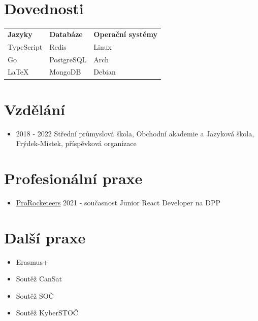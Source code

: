 \documentclass[12pt,a4paper]{article}
\begin{document}
\section*{Dovednosti}

\begin{center}
  \begin{tabular}{ l l l }
    \textbf{\large Jazyky} & \textbf{\large Databáze} & \textbf{\large Operační
      systémy}
    \\
    TypeScript            & Redis                    & Linux
    \\
    Go                    & PostgreSQL               & Arch
    \\
    LaTeX                 & MongoDB                  & Debian
    \\
  \end{tabular}
\end{center}

\section*{Vzdělání}

\begin{itemize}
  \item 2018 - 2022 Střední průmyslová škola, Obchodní akademie a
        Jazyková škola,
        Frýdek-Místek, příspěvková organizace
\end{itemize}

\section*{Profesionální praxe}
\begin{itemize}
  \item \underline{\href{https://www.prorocketeers.com/}{ProRocketeers}} 2021 - současnost
        \subitem Junior React Developer na DPP
\end{itemize}

\section*{Další praxe}

\begin{itemize}
  \item Erasmus+
  \item Soutěž CanSat
  \item Soutěž SOČ
  \item Soutěž KyberSTOČ
\end{itemize}
\end{document}
